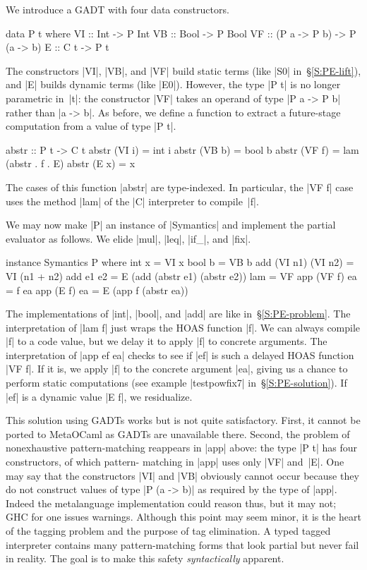 \documentclass[preprint]{sigplanconf}
\begin{document}
We introduce a GADT with four data constructors.
\begin{code}
data P t where
  VI :: Int  -> P Int
  VB :: Bool -> P Bool
  VF :: (P a -> P b) -> P (a -> b)
  E  :: C t -> P t
\end{code}
The constructors |VI|, |VB|, and |VF| build static terms (like |S0|
in~\S\ref{S:PE-lift}), and |E| builds dynamic terms (like |E0|).  However,
the type |P t| is no longer parametric in~|t|: the constructor |VF| takes an
operand of type |P a -> P b| rather than |a -> b|. As before, we define a
function to extract a future-stage computation from a value of type |P t|.
\begin{code}
abstr :: P t -> C t
abstr (VI i) = int i
abstr (VB b) = bool b
abstr (VF f) = lam (abstr . f . E)
abstr (E x)  = x
\end{code}
The cases of this function |abstr| are type-indexed.  In particular, the |VF f|
case uses the method |lam| of the |C| interpreter to compile~|f|.

We may now make |P| an instance of
|Symantics| and implement the partial evaluator as follows. We elide
|mul|, |leq|, |if_|, and |fix|.
\begin{code}
instance Symantics P where
  int x  = VI x
  bool b = VB b
  add (VI n1) (VI n2) = VI (n1 + n2)
  add e1 e2 = E (add (abstr e1) (abstr e2))
  lam = VF
  app (VF f) ea = f ea
  app (E f)  ea = E (app f (abstr ea))
\end{code}
The implementations of |int|, |bool|, and |add| are like
in~\S\ref{S:PE-problem}.
The interpretation of |lam f| just wraps the
HOAS function |f|. We can always compile |f| to a code value,
but we delay it to apply |f| to concrete arguments. The interpretation of
|app ef ea| checks to see if |ef| is such a delayed
HOAS function |VF f|. If it is, we apply |f| to the
concrete argument |ea|, giving us a chance to perform static
computations (see example |testpowfix7| in~\S\ref{S:PE-solution}). If |ef| is a
dynamic value |E f|, we residualize.

This solution using GADTs works but is not quite satisfactory. First, it
cannot be ported to MetaOCaml as GADTs are unavailable there.  Second,
the problem of nonexhaustive pattern\hyp matching reappears in |app|
above: the type |P t| has four constructors, of which pattern\hyp
matching in |app| uses only |VF| and~|E|. One may say that the
constructors |VI| and |VB| obviously cannot occur because they do not
construct values of type |P (a -> b)| as required by the type of |app|.
Indeed the metalanguage implementation could reason thus, but it may not; GHC for one
issues warnings.  Although this point may seem minor, it is the heart of
the tagging problem and the purpose of tag elimination. A typed tagged
interpreter contains many pattern\hyp matching forms that look partial
but never fail in reality. The goal is to make this safety
\emph{syntactically} apparent.
\end{document}
